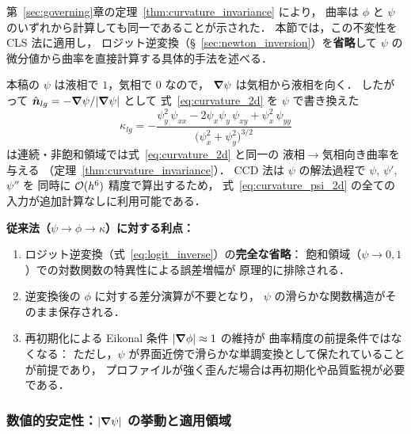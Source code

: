 第~\ref{sec:governing}章の定理~\ref{thm:curvature_invariance} により，
曲率は $\phi$ と $\psi$ のいずれから計算しても同一であることが示された．
本節では，この不変性を CLS 法に適用し，
ロジット逆変換（§~\ref{sec:newton_inversion}）を\textbf{省略}して
$\psi$ の微分値から曲率を直接計算する具体的手法を述べる．

\begin{tcolorbox}[resultbox, title={CLS 法における $\psi$ 微分による曲率の直接計算}]
本稿の $\psi$ は液相で $1$，気相で $0$ なので，
$\bm{\nabla}\psi$ は気相から液相を向く．
したがって $\hat{\bm n}_{lg}=-\bm{\nabla}\psi/|\bm{\nabla}\psi|$ として
式~\eqref{eq:curvature_2d} を $\psi$ で書き換えた
\begin{equation}
  \kappa_{lg} = -\frac{
    \psi_y^2\,\psi_{xx}
    - 2\psi_x\psi_y\,\psi_{xy}
    + \psi_x^2\,\psi_{yy}
  }{\bigl(\psi_x^2 + \psi_y^2\bigr)^{3/2}}
  \label{eq:curvature_psi_2d}
\end{equation}
は連続・非飽和領域では式~\eqref{eq:curvature_2d} と同一の
液相$\to$気相向き曲率を与える
（定理~\ref{thm:curvature_invariance}）．
CCD 法は $\psi$ の解法過程で $\psi$, $\psi'$, $\psi''$ を
同時に $\mathcal{O}(h^6)$ 精度で算出するため，
式~\eqref{eq:curvature_psi_2d} の全ての入力が追加計算なしに利用可能である．

\medskip
\noindent\textbf{従来法（$\psi \to \phi \to \kappa$）に対する利点：}
\begin{enumerate}
  \item ロジット逆変換（式~\eqref{eq:logit_inverse}）の\textbf{完全な省略}：
        飽和領域（$\psi \to 0, 1$）での対数関数の特異性による誤差増幅が
        原理的に排除される．
  \item 逆変換後の $\phi$ に対する差分演算が不要となり，
        $\psi$ の滑らかな関数構造がそのまま保存される．
  \item 再初期化による Eikonal 条件 $|\bm{\nabla}\phi| \approx 1$ の維持が
        曲率精度の前提条件ではなくなる：
        ただし，$\psi$ が界面近傍で滑らかな単調変換として保たれていることが前提であり，
        プロファイルが強く歪んだ場合は再初期化や品質監視が必要である．
\end{enumerate}
\end{tcolorbox}

\subsubsection{\texorpdfstring{数値的安定性：$|\bm{\nabla}\psi|$ の挙動と適用領域}{数値的安定性：|∇ψ| の挙動と適用領域}}

